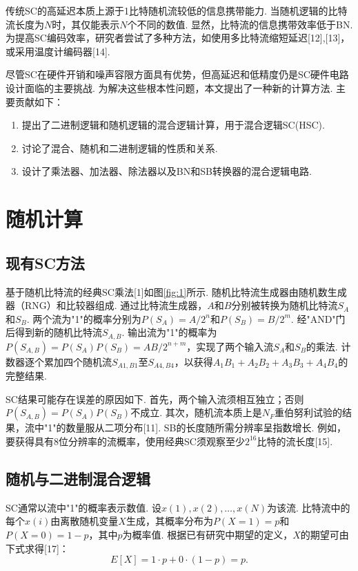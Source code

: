 \documentclass{solitairemiya-art}
\begin{document}
传统SC的高延迟本质上源于1比特随机流较低的信息携带能力. 当随机逻辑的比特流长度为$N$时，其仅能表示$N$个不同的数值. 显然，比特流的信息携带效率低于BN. 为提高SC编码效率，研究者尝试了多种方法，如使用多比特流缩短延迟[12],[13]，或采用温度计编码器[14]. 

尽管SC在硬件开销和噪声容限方面具有优势，但高延迟和低精度仍是SC硬件电路设计面临的主要挑战. 为解决这些根本性问题，本文提出了一种新的计算方法. 主要贡献如下：
\begin{enumerate}
    \item 提出了二进制逻辑和随机逻辑的混合逻辑计算，用于混合逻辑SC(HSC). 
    \item 讨论了混合、随机和二进制逻辑的性质和关系. 
    \item 设计了乘法器、加法器、除法器以及BN和SB转换器的混合逻辑电路. 
\end{enumerate}

\section{随机计算}

\subsection{现有SC方法}

基于随机比特流的经典SC乘法[1]如图\ref{fig:1}所示. 随机比特流生成器由随机数生成器（RNG）和比较器组成. 通过比特流生成器，$A$和$B$分别被转换为随机比特流$S_A$和$S_B$. 两个流为"1"的概率分别为$P(S_A) = A/2^n$和$P(S_B) = B/2^m$. 经"AND"门后得到新的随机比特流$S_{A,B}$. 输出流为"1"的概率为$P(S_{A,B}) = P(S_A)P(S_B) = AB/2^{n+m}$，实现了两个输入流$S_A$和$S_B$的乘法. 计数器逐个累加四个随机流$S_{A1,B1}$至$S_{A4,B4}$，以获得$A_1B_1 + A_2B_2 + A_3B_3 + A_4B_4$的完整结果. 

SC结果可能存在误差的原因如下. 首先，两个输入流须相互独立；否则$P(S_{A,B}) = P(S_A)P(S_B)$不成立. 其次，随机流本质上是$N_F$重伯努利试验的结果，流中"1"的数量服从二项分布[11]. SB的长度随所需分辨率呈指数增长. 例如，要获得具有8位分辨率的流概率，使用经典SC须观察至少$2^{16}$比特的流长度[15]. 

\subsection{随机与二进制混合逻辑}

SC通常以流中"1"的概率表示数值. 设$x(1), x(2), \ldots, x(N)$为该流. 比特流中的每个$x(i)$由离散随机变量$X$生成，其概率分布为$P(X=1) = p$和$P(X=0) = 1-p$，其中$p$为概率值. 根据已有研究中期望的定义，$X$的期望可由下式求得[17]：
\begin{equation}
E[X] = 1 \cdot p + 0 \cdot (1-p) = p.
\label{eq:1}
\end{equation}
\end{document}
